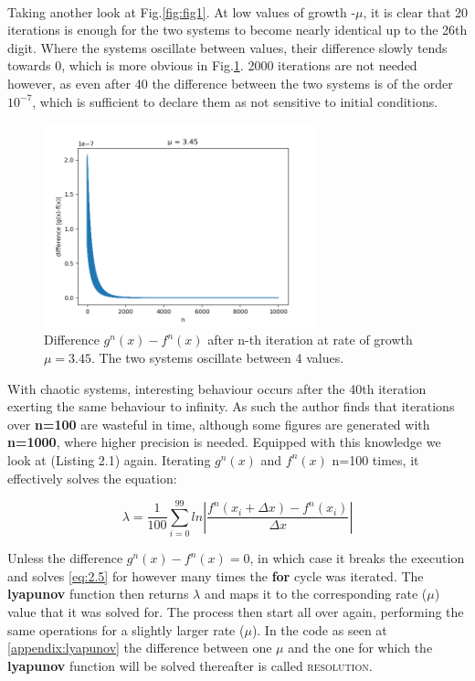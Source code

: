 \paragraph{}
Taking another look at Fig.\ref{fig:fig1}. At low values of growth -$\mu$,
it is clear that 20 iterations is enough for the two systems to become nearly identical 
up to the 26th digit. Where the systems oscillate between values, their difference 
slowly tends towards 0, which is more obvious in Fig.\ref{fig:fig2}. 2000 iterations
are not needed however, as even after 40 the difference between the two systems
is of the order $10^{-7}$, which is sufficient to declare them as not sensitive to
initial conditions.

\begin{figure}[h]
    \centering
    \includegraphics[width=0.7\textwidth]{Images/diff3.45555.png}
    \caption{Difference $g^n(x)-f^n(x)$ after n-th iteration at rate of growth $\mu=3.45$. The two systems oscillate between 4 values.}
    \label{fig:fig2}
\end{figure}

With chaotic systems, interesting behaviour occurs after the 40th 
iteration exerting the same behaviour to infinity. As such
the author finds that iterations over \textbf{n=100} are wasteful
in time, although some figures are generated with \textbf{n=1000},
where higher precision is needed.
Equipped with this knowledge we look at (Listing 2.1) again. 
Iterating $g^n(x)$ and $f^n(x)$ n=100 times, it effectively solves the equation:

\begin{equation}
    \label{eq:2.5}
    \lambda = \frac{1}{100} \sum_{i=0}^{99} ln\left| \frac{f^n (x_i+\Delta x) - f^n (x_i)}{\Delta x} \right| 
\end{equation}

Unless the difference $g^n(x)-f^n(x) = 0$, in which case it breaks the execution and solves \ref{eq:2.5}
for however many times the \textbf{for} cycle was iterated. The \textbf{lyapunov} function then returns $\lambda$ and maps it
to the corresponding rate ($\mu$) value that it was solved for. The process then start all over again,
performing the same operations for a slightly larger rate ($\mu$). In the code as seen at \ref{appendix:lyapunov}
the difference between one $\mu$ and the one for which the \textbf{lyapunov} function will be solved
thereafter is called \textsc{resolution}.

